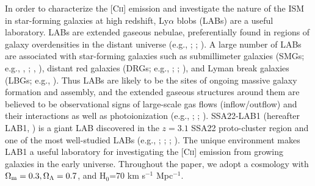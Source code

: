 \documentclass[apj]{emulateapj}
\begin{document}
In order to characterize the [\textsc{Cii}] emission and investigate the nature of the ISM in star-forming galaxies at high redshift,
Ly$\alpha$ blobs (LABs) are a useful laboratory.
LABs are extended gaseous nebulae, preferentially found in regions of galaxy overdensities in the distant universe (e.g., \citealt{2000ApJ...532..170S}; \citealt{2004AJ....128..569M}; \citealt{2009ApJ...693.1579Y}).
A large number of LABs are associated with star-forming galaxies such as submillimeter galaxies (SMGs; e.g., \citealt{2005MNRAS.363.1398G}, \citeyear{2014ApJ...793...22G}; \citealt{2015ApJ...815L...8U}, \citeyear{2016arXiv161109857U}), distant red galaxies (DRGs; e.g., \citealt{2011ApJ...740L..31E}; \citealt{2012ApJ...750..116U}; \citealt{2013ApJ...778..170K}), and Lyman break galaxies (LBGs; e.g., \citealt{2004AJ....128..569M}).
Thus LABs are likely to be the sites of ongoing massive galaxy formation and assembly, and the extended gaseous structures around them are believed to be observational signs of large-scale gas flows (inflow/outflow) and their interactions as well as photoionization (e.g., \citealt{2000ApJ...532L..13T}; \citealt{2006Natur.440..644M}; \citealt{2009MNRAS.400.1109D}).
%
SSA22-LAB1 (hereafter LAB1, \citealt{2000ApJ...532..170S}) is a giant LAB discovered in the $z=3.1$ SSA22 proto-cluster region and one of the most well-studied LABs (e.g., \citealt{2004ApJ...606...85C}; \citealt{2014ApJ...793...22G}; \citealt{2011Natur.476..304H}; \citealt{2015ApJ...799...38K}).
The unique environment
makes LAB1 a useful laboratory for investigating the [\textsc{Cii}] emission from growing galaxies in the early universe.
Throughout the paper, we adopt a cosmology with 
$\Omega_{\rm m}=0.3, \Omega_\Lambda=0.7$, and H$_0$=70 km s$^{-1}$ Mpc$^{-1}$.
\end{document}
